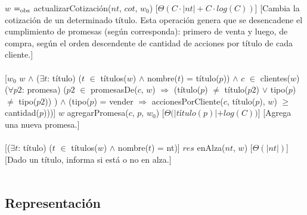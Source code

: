   {$w$ $=_{\mathrm{obs}}$ actualizarCotizaci\'on($nt$, $cot$, $w_{0}$)}%
  [$\Theta(C \cdotp |nt|+C \cdotp log(C))$]
  [Cambia la cotizaci\'on de un determinado t\'itulo. Esta operaci\'on genera que se desencadene el cumplimiento de promesas (seg\'un corresponda): primero de venta y luego, de compra, seg\'un el orden descendente de cantidad de acciones por t\'itulo de cada cliente.]\\\\
  [$w_{0}$ \igobs $w$ $\land$ ($\exists$$t$: t\'itulo) ($t$ $\in$ t\'itulos($w$) $\land$ nombre($t$) = t\'itulo($p$)) $\land$ $c$ $\in$ clientes($w$) \yluego ($\forall$$p2$: promesa) ($p2$ $\in$ promesasDe($c$, $w$) $\Rightarrow$ (t\'itulo($p$) $\neq$ t\'itulo($p2$) $\lor$ tipo($p$) $\neq$ tipo($p2$)) ) $\land$ (tipo($p$) = vender $\Rightarrow$ accionesPorCliente($c$, t\'itulo($p$), $w$) $\geq$ cantidad($p$)))]
  {$w$ \igobs agregarPromesa($c$, $p$, $w_{0}$)}%
  [$\Theta(|t$\'i$tulo(p)| + log(C))$]
  [Agrega una nueva promesa.]\\\\
  [($\exists$$t$: t\'itulo) ($t$ $\in$ t\'itulos($w$) $\land$ nombre($t$) = nt)]
  {$res$ \igobs enAlza($nt$, $w$)}%
  [$\Theta(|nt|)$]
  [Dado un t\'itulo, informa si est\'a o no en alza.]\\\\


\subsection{Representaci\'on}
